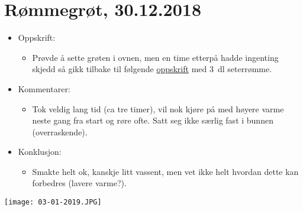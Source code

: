 \documentclass[12pt]{article}
\begin{document}
\section*{R{\o}mmegr{\o}t, 30.12.2018}
\begin{itemize}
\item Oppskrift:
  \begin{itemize}
  \item Prøvde å sette grøten i ovnen, men en time etterpå hadde
    ingenting skjedd så gikk tilbake til f{\o}lgende
    \href{https://www.melk.no/Oppskrifter/Groeter/Tradisjonsgroet/Risengrynsgroet}{oppskrift}
    med 3~dl seterr{\o}mme.
  \end{itemize}
\item Kommentarer:
  \begin{itemize}
    \item Tok veldig lang tid (ca tre timer), vil nok kjøre på med
      høyere varme neste gang fra start og røre ofte. Satt seg ikke
      særlig fast i bunnen (overraskende).
  \end{itemize}
\item Konklusjon:
  \begin{itemize}
  \item Smakte helt ok, kanskje litt vassent, men vet ikke helt hvordan dette kan forbedres (lavere varme?). 
  \end{itemize}
\end{itemize}
\centering
\texttt{[image: 03-01-2019.JPG]}
\end{document}

